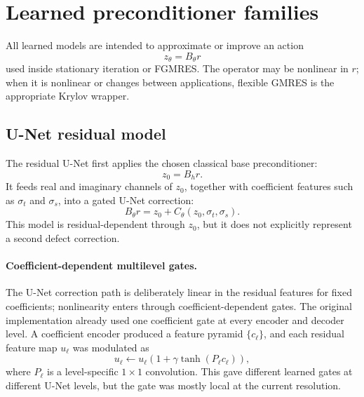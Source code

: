\documentclass[11pt]{article}
\newcommand{\Bh}{B_h}
\begin{document}
\section{Learned preconditioner families}

All learned models are intended to approximate or improve an action
\[
  z_\theta = B_\theta r
\]
used inside stationary iteration or FGMRES.  The operator may be nonlinear in
\(r\); when it is nonlinear or changes between applications, flexible GMRES is
the appropriate Krylov wrapper.

\subsection{U-Net residual model}

The residual U-Net first applies the chosen classical base preconditioner:
\[
  z_0=\Bh r.
\]
It feeds real and imaginary channels of \(z_0\), together with coefficient
features such as \(\sigma_t\) and \(\sigma_s\), into a gated U-Net correction:
\begin{equation}
  B_\theta r
  =
  z_0 + C_\theta(z_0,\sigma_t,\sigma_s).
\end{equation}
This model is residual-dependent through \(z_0\), but it does not explicitly
represent a second defect correction.

\paragraph{Coefficient-dependent multilevel gates.}
The U-Net correction path is deliberately linear in the residual features for
fixed coefficients; nonlinearity enters through coefficient-dependent gates.
The original implementation already used one coefficient gate at every encoder
and decoder level.  A coefficient encoder produced a feature pyramid
\(\{c_\ell\}\), and each residual feature map \(u_\ell\) was modulated as
\[
  u_\ell \leftarrow
  u_\ell\left(1+\gamma\tanh(P_\ell c_\ell)\right),
\]
where \(P_\ell\) is a level-specific \(1\times1\) convolution.  This gave
different learned gates at different U-Net levels, but the gate was mostly
local at the current resolution.
\end{document}
